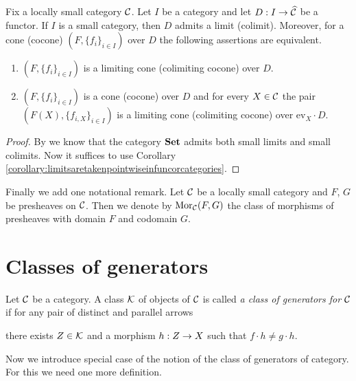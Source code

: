 \begin{corollary}\label{corollary:limitsinpresheaves}
Fix a locally small category ${\mathcal C}$. Let $I$ be a category and let $D:I\rightarrow \widehat{{\mathcal C}}$ be a functor. If $I$ is a small category, then $D$ admits a limit (colimit). Moreover, for a cone (cocone) $\left(F,\big\{f_i\big\}_{i\in I}\right)$ over $D$ the following assertions are equivalent.
\begin{enumerate}[label=\emph{\textbf{(\roman*)}}, leftmargin=1.5em]
\item $\left(F,\big\{f_i\big\}_{i\in I}\right)$ is a limiting cone (colimiting cocone) over $D$.
\item $\left(F,\big\{f_i\big\}_{i\in I}\right)$ is a cone (cocone) over $D$ and for every $X\in {\mathcal C}$ the pair $\left(F(X),\big\{f_{i,X}\big\}_{i\in I}\right)$ is a limiting cone (colimiting cocone) over $\mathrm{ev}_X\cdot D$.
\end{enumerate}
\end{corollary}
\begin{proof}
By {\cite[V.1, Theorem 1 and Exercise 8]{Maclane}} we know that the category $\mathbf{Set}$ admits both small limits and small colimits. Now it suffices to use Corollary \ref{corollary:limitsaretakenpointwiseinfuncorcategories}.
\end{proof}
\noindent
Finally we add one notational remark. Let ${\mathcal C}$ be a locally small category and $F$, $G$ be presheaves on ${\mathcal C}$. Then we denote by $\mathrm{Mor}_{{\mathcal C}}(F,G)$ the class of morphisms of presheaves with domain $F$ and codomain $G$.

\section{Classes of generators}

\begin{definition}
Let ${\mathcal C}$ be a category. A class ${\mathcal K}$ of objects of ${\mathcal C}$ is called \textit{a class of generators for ${\mathcal C}$} if for any pair of distinct and parallel arrows 
\begin{center}
\end{center}
there exists $Z\in {\mathcal K}$ and a morphism $h:Z\rightarrow X$ such that $f\cdot h\neq g\cdot h$.
\end{definition}
\noindent
Now we introduce special case of the notion of the class of generators of category. For this we need one more definition.

